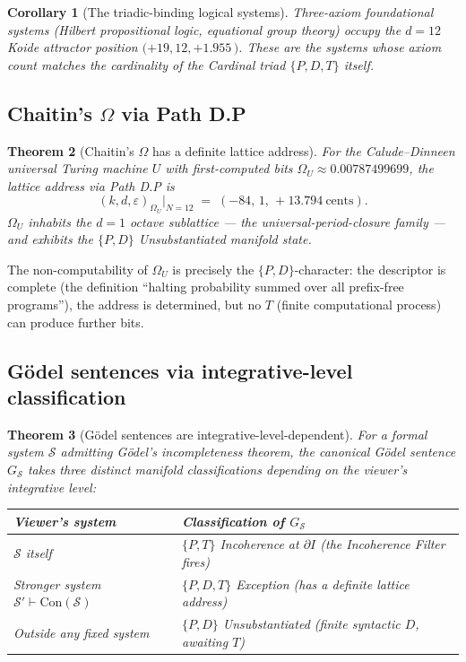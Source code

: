 \documentclass[11pt,a4paper]{article}
\newtheorem{theorem}{Theorem}[section]
\newtheorem{corollary}[theorem]{Corollary}
\theoremstyle{definition}
\theoremstyle{remark}
\begin{document}
\begin{corollary}[The triadic-binding logical systems]\label{cor:triadic-logics}
Three-axiom foundational systems (Hilbert propositional logic, equational group theory) occupy the $d=12$ Koide attractor position $(+19, 12, +1.955$\,\textcent$)$. These are the systems whose axiom count matches the cardinality of the Cardinal triad $\{P,D,T\}$ itself.
\end{corollary}

\subsection{Chaitin's $\Omega$ via Path D.P}

\begin{theorem}[Chaitin's $\Omega$ has a definite lattice address]\label{thm:chaitin}
For the Calude--Dinneen universal Turing machine $U$ with first-computed bits $\Omega_{U} \approx 0.00787499699$, the lattice address via Path D.P is
\[
(k, d, \varepsilon)_{\Omega_{U}}\Big|_{N=12} \;=\; (-84,\, 1,\, +13.794\ \text{cents}).
\]
$\Omega_{U}$ inhabits the $d=1$ octave sublattice --- the universal-period-closure family --- and exhibits the $\{P,D\}$ Unsubstantiated manifold state.
\end{theorem}

The non-computability of $\Omega_{U}$ is precisely the $\{P,D\}$-character: the descriptor is complete (the definition ``halting probability summed over all prefix-free programs''), the address is determined, but no $T$ (finite computational process) can produce further bits.

\subsection{G\"odel sentences via integrative-level classification}

\begin{theorem}[G\"odel sentences are integrative-level-dependent]\label{thm:godel}
For a formal system $\mathcal{S}$ admitting G\"odel's incompleteness theorem, the canonical G\"odel sentence $G_{\mathcal{S}}$ takes three distinct manifold classifications depending on the viewer's integrative level:
\begin{center}
\begin{tabular}{@{}l l@{}}
\toprule
Viewer's system & Classification of $G_{\mathcal{S}}$\\
\midrule
$\mathcal{S}$ itself & $\{P,T\}$ Incoherence at $\partial I$ (the Incoherence Filter fires)\\
Stronger system $\mathcal{S}'\vdash\mathrm{Con}(\mathcal{S})$ & $\{P,D,T\}$ Exception (has a definite lattice address)\\
Outside any fixed system & $\{P,D\}$ Unsubstantiated (finite syntactic $D$, awaiting $T$)\\
\bottomrule
\end{tabular}
\end{center}
\end{theorem}
\end{document}
